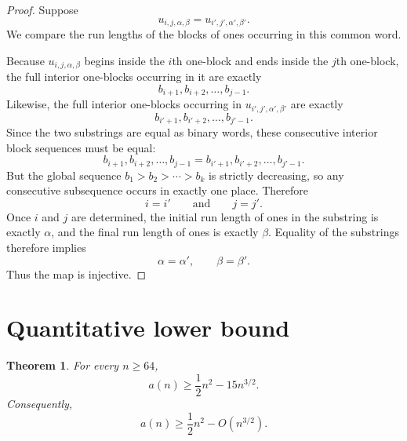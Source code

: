 \documentclass[11pt]{article}
\newtheorem{theorem}{Theorem}
\begin{document}
\begin{proof}
Suppose
\[
u_{i,j,\alpha,\beta}=u_{i',j',\alpha',\beta'}.
\]
We compare the run lengths of the blocks of ones occurring in this common word.

Because $u_{i,j,\alpha,\beta}$ begins inside the $i$th one-block and ends inside the $j$th one-block, the full interior one-blocks occurring in it are exactly
\[
b_{i+1},b_{i+2},\dots,b_{j-1}.
\]
Likewise, the full interior one-blocks occurring in $u_{i',j',\alpha',\beta'}$ are exactly
\[
b_{i'+1},b_{i'+2},\dots,b_{j'-1}.
\]
Since the two substrings are equal as binary words, these consecutive interior block sequences must be equal:
\[
b_{i+1},b_{i+2},\dots,b_{j-1}=b_{i'+1},b_{i'+2},\dots,b_{j'-1}.
\]
But the global sequence $b_1>b_2>\cdots>b_k$ is strictly decreasing, so any consecutive subsequence occurs in exactly one place.  Therefore
\[
i=i'\qquad\text{and}\qquad j=j'.
\]
Once $i$ and $j$ are determined, the initial run length of ones in the substring is exactly $\alpha$, and the final run length of ones is exactly $\beta$.  Equality of the substrings therefore implies
\[
\alpha=\alpha',\qquad \beta=\beta'.
\]
Thus the map is injective.
\end{proof}

\section{Quantitative lower bound}

\begin{theorem}\label{thm:explicit}
For every $n\ge 64$,
\[
a(n)\ge \frac12 n^2-15n^{3/2}.
\]
Consequently,
\[
a(n)\ge \frac12 n^2-O(n^{3/2}).
\]
\end{theorem}
\end{document}
